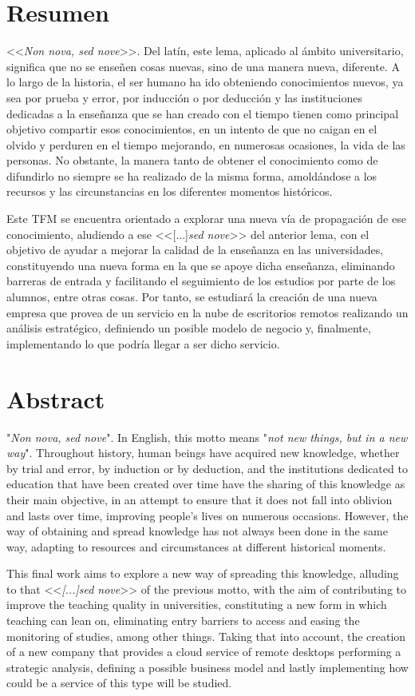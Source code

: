 \chapter{Resumen}

<<\textit{Non nova, sed nove}>>. Del latín, este lema, aplicado al ámbito universitario, significa que no se enseñen cosas nuevas, sino de una manera nueva, diferente. A lo largo de la historia, el ser humano ha ido obteniendo conocimientos nuevos, ya sea por prueba y error, por inducción o por deducción y las instituciones dedicadas a la enseñanza que se han creado con el tiempo tienen como principal objetivo compartir esos conocimientos, en un intento de que no caigan en el olvido y perduren en el tiempo mejorando, en numerosas ocasiones, la vida de las personas. No obstante, la manera tanto de obtener el conocimiento como de difundirlo no siempre se ha realizado de la misma forma, amoldándose a los recursos y las circunstancias en los diferentes momentos históricos.

Este \acf{TFM} se encuentra orientado a explorar una nueva vía de propagación de ese conocimiento, aludiendo a ese <<[...]\textit{sed nove}>> del anterior lema, con el objetivo de ayudar a mejorar la calidad de la enseñanza en las universidades, constituyendo una nueva forma en la que se apoye dicha enseñanza, eliminando barreras de entrada y facilitando el seguimiento de los estudios por parte de los alumnos, entre otras cosas. Por tanto, se estudiará la creación de una nueva empresa que provea de un servicio en la nube de escritorios remotos realizando un análisis estratégico, definiendo un posible modelo de negocio y, finalmente, implementando lo que podría llegar a ser dicho servicio.

\chapter{Abstract}

"\textit{Non nova, sed nove}". In English, this motto means "\textit{not new things, but in a new way}". Throughout history, human beings have acquired new knowledge, whether by trial and error, by induction or by deduction, and the institutions dedicated to education that have been created over time have the sharing of this knowledge as their main objective, in an attempt to ensure that it does not fall into oblivion and lasts over time, improving people's lives on numerous occasions. However, the way of obtaining and spread knowledge has not always been done in the same way, adapting to resources and circumstances at different historical moments.

This final work aims to explore a new way of spreading this knowledge, alluding to that <<\textit{[...]sed nove}>> of the previous motto, with the aim of contributing to improve the teaching quality in universities, constituting a new form in which teaching can lean on, eliminating entry barriers to access and easing the monitoring of studies, among other things. Taking that into account, the creation of a new company that provides a cloud service of remote desktops performing a strategic analysis, defining a possible business model and lastly implementing how could be a service of this type will be studied.
